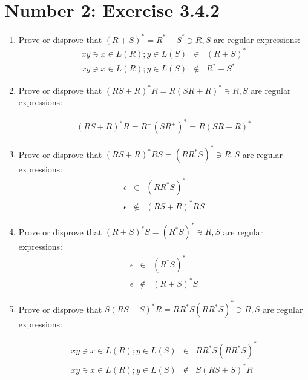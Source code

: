 \documentclass[12pt,a4paper,twoside]{article}  %
\begin{document}
\section{Number 2: Exercise 3.4.2}
\begin{enumerate}

\item Prove or disprove that $(R + S)^* = R^* + S^* \ni R,S$ are regular expressions:
\begin{eqnarray}
xy \ni x \in L(R); y \in L(S) &\in& (R + S)^* \\
xy \ni x \in L(R); y \in L(S) &\not \in& R^* + S^*
\end{eqnarray}

\item Prove or disprove that $(RS + R)^*R = R(SR + R)^* \ni R,S$ are regular expressions:

\begin{eqnarray}
(RS + R)^*R = R^+(SR^+)^* = R(SR + R)^*
\end{eqnarray}

\item Prove or disprove that $(RS + R)^*RS = (RR^*S)^* \ni R,S$ are regular expressions:
\begin{eqnarray}
\epsilon &\in& (RR^*S)^* \\
\epsilon &\not \in& (RS + R)^*RS
\end{eqnarray}

\item Prove or disprove that $(R + S)^*S = (R^*S)^* \ni R,S$ are regular expressions:
\begin{eqnarray}
\epsilon &\in& (R^*S)^* \\
\epsilon &\not \in& (R + S)^*S
\end{eqnarray}

\item Prove or disprove that $S(RS + S)^*R = RR^*S(RR^*S)^* \ni R,S$ are regular expressions:

\begin{eqnarray}
xy \ni x \in L(R); y \in L(S) &\in& RR^*S(RR^*S)^* \\
xy \ni x \in L(R); y \in L(S) &\not \in& S(RS + S)^*R
\end{eqnarray}

\end{enumerate}
\end{document}
